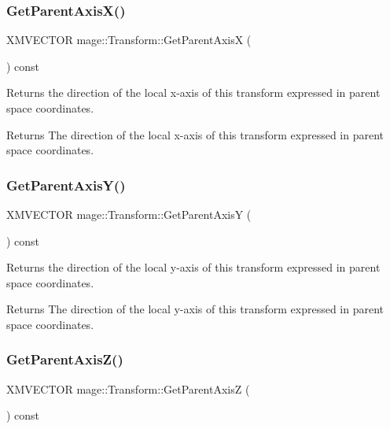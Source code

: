 \subsubsection{\texorpdfstring{Get\+Parent\+Axis\+X()}{GetParentAxisX()}}
{\footnotesize\ttfamily X\+M\+V\+E\+C\+T\+OR mage\+::\+Transform\+::\+Get\+Parent\+AxisX (\begin{DoxyParamCaption}{ }\end{DoxyParamCaption}) const}

Returns the direction of the local x-\/axis of this transform expressed in parent space coordinates.

\begin{DoxyReturn}{Returns}
The direction of the local x-\/axis of this transform expressed in parent space coordinates. 
\end{DoxyReturn}
\hypertarget{structmage_1_1_transform_a973c17d7d77c742f0b6d8fbdf5041128}{}\label{structmage_1_1_transform_a973c17d7d77c742f0b6d8fbdf5041128} 
\subsubsection{\texorpdfstring{Get\+Parent\+Axis\+Y()}{GetParentAxisY()}}
{\footnotesize\ttfamily X\+M\+V\+E\+C\+T\+OR mage\+::\+Transform\+::\+Get\+Parent\+AxisY (\begin{DoxyParamCaption}{ }\end{DoxyParamCaption}) const}

Returns the direction of the local y-\/axis of this transform expressed in parent space coordinates.

\begin{DoxyReturn}{Returns}
The direction of the local y-\/axis of this transform expressed in parent space coordinates. 
\end{DoxyReturn}
\hypertarget{structmage_1_1_transform_a6b8002971da0bd9acbbd865c7325c860}{}\label{structmage_1_1_transform_a6b8002971da0bd9acbbd865c7325c860} 
\subsubsection{\texorpdfstring{Get\+Parent\+Axis\+Z()}{GetParentAxisZ()}}
{\footnotesize\ttfamily X\+M\+V\+E\+C\+T\+OR mage\+::\+Transform\+::\+Get\+Parent\+AxisZ (\begin{DoxyParamCaption}{ }\end{DoxyParamCaption}) const}

